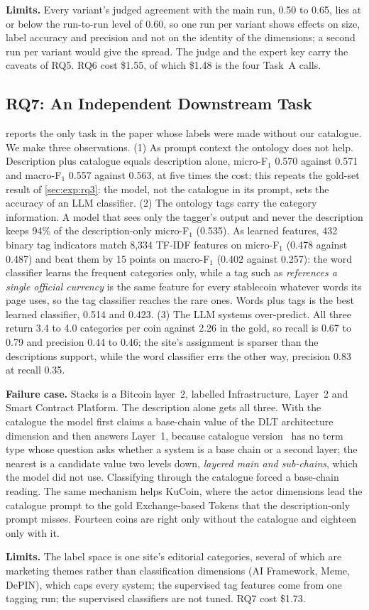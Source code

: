 \textbf{Limits.} Every variant's judged agreement with the main run, 0.50 to
0.65, lies at or below the run-to-run level of 0.60, so one run per variant
shows effects on size, label accuracy and precision and not on the identity
of the dimensions; a second run per variant would give the spread. The judge
and the expert key carry the caveats of RQ5. RQ6 cost \$1.55, of which
\$1.48 is the four Task~A calls.

\subsection{RQ7: An Independent Downstream Task}
\label{sec:exp:rq7}

 reports the only task in the paper whose labels were made
without our catalogue. We make three observations. (1) As prompt context the
ontology does not help. Description plus catalogue equals description alone,
micro-F$_1$ 0.570 against 0.571 and macro-F$_1$ 0.557 against 0.563, at five
times the cost; this repeats the gold-set result of \cref{sec:exp:rq3}: the
model, not the catalogue in its prompt, sets the accuracy of an LLM
classifier. (2) The ontology tags carry the category information. A model
that sees only the tagger's output and never the description keeps 94\% of
the description-only micro-F$_1$ (0.535). As learned features, 432 binary tag
indicators match 8,334 TF-IDF features on micro-F$_1$ (0.478 against 0.487)
and beat them by 15 points on macro-F$_1$ (0.402 against 0.257): the word
classifier learns the frequent categories only, while a tag such as
\emph{references a single official currency} is the same feature for every
stablecoin whatever words its page uses, so the tag classifier reaches the
rare ones. Words plus tags is the best learned classifier, 0.514 and 0.423.
(3) The LLM systems over-predict. All three return 3.4 to 4.0 categories per
coin against 2.26 in the gold, so recall is 0.67 to 0.79 and precision 0.44
to 0.46; the site's assignment is sparser than the descriptions support,
while the word classifier errs the other way, precision 0.83 at recall 0.35.

\textbf{Failure case.} Stacks is a Bitcoin layer~2, labelled Infrastructure,
Layer~2 and Smart Contract Platform. The description alone gets all three.
With the catalogue the model first claims a base-chain value of the DLT
architecture dimension and then answers Layer~1, because catalogue version
\EvalCat\ has no term type whose question asks whether a system is a base
chain or a second layer; the nearest is a candidate value two levels down,
\emph{layered main and sub-chains}, which the model did not use. Classifying
through the catalogue forced a base-chain reading. The same mechanism helps
KuCoin, where the actor dimensions lead the catalogue prompt to the gold
Exchange-based Tokens that the description-only prompt misses. Fourteen coins
are right only without the catalogue and eighteen only with it.

\textbf{Limits.} The label space is one site's editorial categories, several
of which are marketing themes rather than classification dimensions (AI
Framework, Meme, DePIN), which caps every system; the supervised tag features come from one tagging run; the supervised classifiers are not tuned. RQ7 cost \$1.73.
